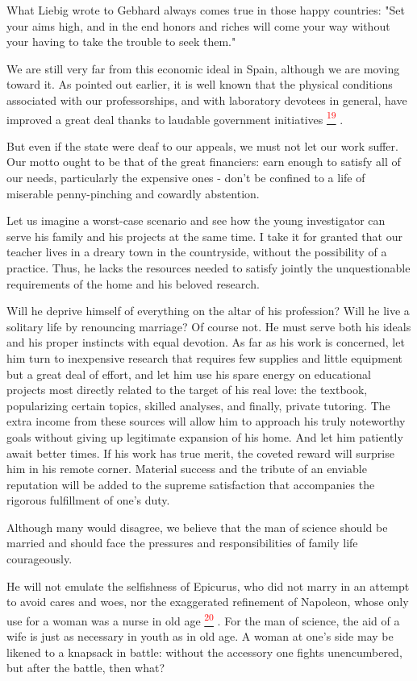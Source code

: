 \documentclass{article}
\newcommand{\noteref}[1]{%
 \hypertarget{ref:#1}{}%
 \hyperlink{note:#1}{\textsuperscript{\textcolor{red}{#1}}}%
}
\begin{document}
What Liebig wrote to Gebhard always comes true in those happy countries: "Set your aims high, and in the end honors and riches will come your way without your having to take the trouble to seek them."

We are still very far from this economic ideal in Spain, although we are moving toward it. As pointed out earlier, it is well known that the physical conditions associated with our professorships, and with laboratory devotees in general, have improved a great deal thanks to laudable government initiatives\noteref{19}.

But even if the state were deaf to our appeals, we must not let our work suffer. Our motto ought to be that of the great financiers: earn enough to satisfy all of our needs, particularly the expensive ones - don’t be confined to a life of miserable penny-pinching and cowardly abstention.

Let us imagine a worst-case scenario and see how the young investigator can serve his family and his projects at the same time. I take it for granted that our teacher lives in a dreary town in the countryside, without the possibility of a practice. Thus, he lacks the resources needed to satisfy jointly the unquestionable requirements of the home and his beloved research.

Will he deprive himself of everything on the altar of his profession? Will he live a solitary life by renouncing marriage? Of course not. He must serve both his ideals and his proper instincts with equal devotion. As far as his work is concerned, let him turn to inexpensive research that requires few supplies and little equipment but a great deal of effort, and let him use his spare energy on educational projects most directly related to the target of his real love: the textbook, popularizing certain topics, skilled analyses, and finally, private tutoring. The extra income from these sources will allow him to approach his truly noteworthy goals without giving up legitimate expansion of his home. And let him patiently await better times. If his work has true merit, the coveted reward will surprise him in his remote corner. Material success and the tribute of an enviable reputation will be added to the supreme satisfaction that accompanies the rigorous fulfillment of one’s duty.

Although many would disagree, we believe that the man of science should be married and should face the pressures and responsibilities of family life courageously.

He will not emulate the selfishness of Epicurus, who did not marry in an attempt to avoid cares and woes, nor the exaggerated refinement of Napoleon, whose only use for a woman was a nurse in old age\noteref{20}. For the man of science, the aid of a wife is just as necessary in youth as in old age. A woman at one’s side may be likened to a knapsack in battle: without the accessory one fights unencumbered, but after the battle, then what?
\end{document}
